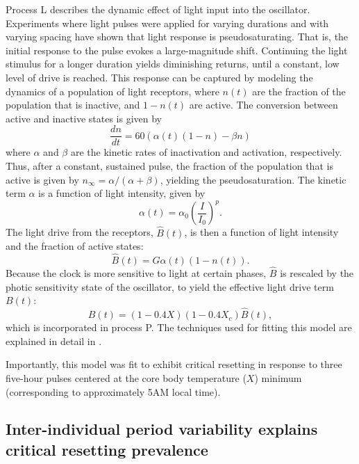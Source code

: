 Process L describes the dynamic effect of light input into the oscillator.
Experiments where light pulses were applied for varying durations and with varying spacing have shown that light response is pseudosaturating.
That is, the initial response to the pulse evokes a large-magnitude shift.
Continuing the light stimulus for a longer duration yields diminishing returns, until a constant, low level of drive is reached.
This response can be captured by modeling the dynamics of a population of light receptors, where $n(t)$ are the fraction of the population that is inactive, and $1-n(t)$ are active.
The conversion between active and inactive states is given by
\begin{equation}
    \frac{dn}{dt} = 60(\alpha(t)(1-n) - \beta n)
\end{equation}
where $\alpha$ and $\beta$ are the kinetic rates of inactivation and activation, respectively.
Thus, after a constant, sustained pulse, the fraction of the population that is active is given by $n_\infty = \alpha/(\alpha+\beta)$, yielding the pseudosaturation.
The kinetic term $\alpha$ is a function of light intensity, given by
\begin{equation}
    \alpha(t) = \alpha_0 \left(\frac{I}{I_0}\right)^p.
\end{equation}
The light drive from the receptors, $\hat B(t)$, is then a function of light intensity and the fraction of active states:
\begin{equation}
    \hat B(t) = G\alpha(t)(1-n(t)).
\end{equation}
Because the clock is more sensitive to light at certain phases, $\hat B$ is rescaled by the photic sensitivity state of the oscillator, to yield the effective light drive term $B(t)$:
\begin{equation}
    B(t) = (1-0.4X)(1-0.4X_c)\hat B(t),
\end{equation}
which is incorporated in process P.
The techniques used for fitting this model are explained in detail in \cite{Kronauer1999}.

Importantly, this model was fit to exhibit critical resetting in response to three five-hour pulses centered at the core body temperature ($X$) minimum (corresponding to approximately 5AM local time).

\subsection*{Inter-individual period variability explains critical resetting prevalence}

